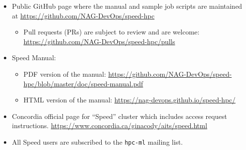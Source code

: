 
\begin{itemize}
    \item
    Public GitHub page where the manual and sample job scripts are maintained at \url{https://github.com/NAG-DevOps/speed-hpc}
        \begin{itemize}
            \item Pull requests (PRs) are subject to review and are welcome: \url{https://github.com/NAG-DevOps/speed-hpc/pulls}
        \end{itemize}
    
    \item
    Speed Manual:
        \begin{itemize}
            \item PDF version of the manual: \url{https://github.com/NAG-DevOps/speed-hpc/blob/master/doc/speed-manual.pdf}
            \item HTML version of the manual: \url{https://nag-devops.github.io/speed-hpc/}
        \end{itemize}
    
    \item
    Concordia official page for ``Speed'' cluster which includes access request instructions.
    \url{https://www.concordia.ca/ginacody/aits/speed.html}
    
    \item
    All Speed users are subscribed to the \texttt{hpc-ml} mailing list.
    
    \nocite{speed-intro-preso}
    
\end{itemize}